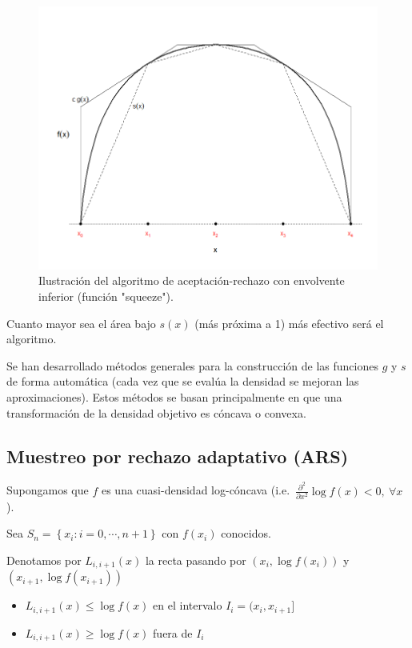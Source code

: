 \documentclass[
  10pt,
]{book}
\theoremstyle{break}
\theoremstyle{nonumberplain}
\begin{document}
\begin{figure}[!htbp]

{\centering \includegraphics[width=0.75\linewidth]{images/squeeze} 

}

\caption{Ilustración del algoritmo de aceptación-rechazo con envolvente inferior (función "squeeze").}\label{fig:squeeze}
\end{figure}

Cuanto mayor sea el área bajo \(s(x)\) (más próxima a 1)
más efectivo será el algoritmo.

Se han desarrollado métodos generales para la construcción de las
funciones \(g\) y \(s\) de forma automática
(cada vez que se evalúa la densidad se mejoran las aproximaciones).
Estos métodos se basan principalmente en que una transformación de
la densidad objetivo es cóncava o convexa.

\hypertarget{ars}{%
\subsection{Muestreo por rechazo adaptativo (ARS)}\label{ars}}

Supongamos que \(f\) es una cuasi-densidad log-cóncava
(i.e.~\(\frac{\partial ^{2}}{\partial x^{2}}\log f(x) <0, ~\forall x\)).

Sea \(S_n=\left\{ x_{i}:i=0,\cdots ,n+1\right\}\) con
\(f(x_{i})\) conocidos.

Denotamos por \(L_{i,i+1}(x)\) la recta pasando por \(\left( x_{i},\log f(x_{i})\right)\) y \(\left( x_{i+1},\log f(x_{i+1})\right)\)

\begin{itemize}
\item
  \(L_{i,i+1}(x)\leq \log f(x)\) en el intervalo
  \(I_{i}=(x_{i},x_{i+1}]\)
\item
  \(L_{i,i+1}(x)\geq \log f(x)\) fuera de \(I_{i}\)
\end{itemize}
\end{document}
